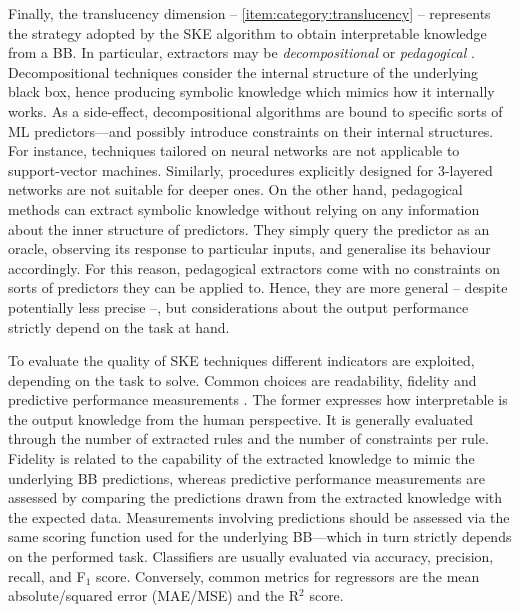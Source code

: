 \documentclass[
]{ceurart}
\begin{document}
Finally, the translucency dimension -- \cref{item:category:translucency} -- represents the strategy adopted by the SKE algorithm to obtain interpretable knowledge from a BB.
%
In particular, extractors may be \emph{decompositional} or \emph{pedagogical} \cite{andrews1995survey,xaisurvey-ia14}. %
%
Decompositional techniques consider the internal structure of the underlying black box, hence producing symbolic knowledge which mimics how it internally works.
%
As a side-effect, decompositional algorithms are bound to specific sorts of ML predictors---and possibly introduce constraints on their internal structures.
%
For instance, techniques tailored on neural networks are not applicable to support-vector machines.
%
Similarly, procedures explicitly designed for 3-layered networks are not suitable for deeper ones.
%
On the other hand, pedagogical methods can extract symbolic knowledge without relying on any information about the inner structure of predictors. 
%
They simply query the predictor as an oracle, observing its response to particular inputs, and generalise its behaviour accordingly.
%
For this reason, pedagogical extractors come with no constraints on sorts of predictors they can be applied to.
%
Hence, they are more general -- despite potentially less precise --, but considerations about the output performance strictly depend on the task at hand.
%

To evaluate the quality of SKE techniques different indicators are exploited, depending on the task to solve.
%
Common choices are readability, fidelity and predictive performance measurements \cite{towell1993extracting}.
%
The former expresses how interpretable is the output knowledge from the human perspective.
%
It is generally evaluated through the number of extracted rules and the number of constraints per rule.
%
Fidelity is related to the capability of the extracted knowledge to mimic the underlying BB predictions, whereas predictive performance measurements are assessed by comparing the predictions drawn from the extracted knowledge with the expected data.
%
Measurements involving predictions should be assessed via the same scoring function used for the underlying BB---which in turn strictly depends on the performed task.
%
Classifiers are usually evaluated via accuracy, precision, recall, and F$_1$ score.
%
Conversely, common metrics for regressors are the mean absolute/squared error (MAE/MSE) and the R${^2}$ score.
\end{document}
